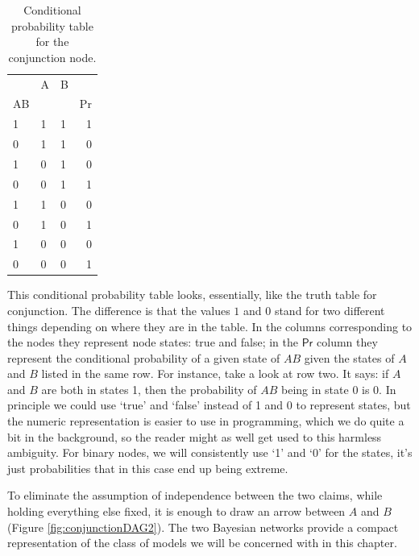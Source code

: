 \documentclass[
  10pt,
  dvipsnames,enabledeprecatedfontcommands]{scrartcl}
\begin{document}
\begin{table}

\begin{tabular}{lllr}
\toprule
\multicolumn{1}{c}{} & \multicolumn{1}{c}{A} & \multicolumn{1}{c}{B} & \multicolumn{1}{c}{} \\
AB &  &  & Pr\\
\midrule
1 & 1 & 1 & 1\\
0 & 1 & 1 & 0\\
1 & 0 & 1 & 0\\
0 & 0 & 1 & 1\\
1 & 1 & 0 & 0\\
0 & 1 & 0 & 1\\
1 & 0 & 0 & 0\\
0 & 0 & 0 & 1\\
\bottomrule
\end{tabular}
\caption{Conditional probability table for the conjunction node.}
\label{tab:CPTconjunction}
\end{table}


\noindent This conditional probability table looks, essentially, like
the truth table for conjunction. The difference is that the values \(1\)
and \(0\) stand for two different things depending on where they are in
the table. In the columns corresponding to the nodes they represent node
states: true and false; in the \(\textsf{Pr}\) column they represent the
conditional probability of a given state of \(AB\) given the states of
\(A\) and \(B\) listed in the same row. For instance, take a look at row
two. It says: if \(A\) and \(B\) are both in states 1, then the
probability of \(AB\) being in state 0 is 0. In principle we could use
`true' and `false' instead of 1 and 0 to represent states, but the
numeric representation is easier to use in programming, which we do
quite a bit in the background, so the reader might as well get used to
this harmless ambiguity. For binary nodes, we will consistently use `1'
and `0' for the states, it's just probabilities that in this case end up
being extreme.

To eliminate the assumption of independence between the two claims,
while holding everything else fixed, it is enough to draw an arrow
between \(A\) and \(B\) (Figure \ref{fig:conjunctionDAG2}). The two
Bayesian networks provide a compact representation of the class of
models we will be concerned with in this chapter.
\end{document}
